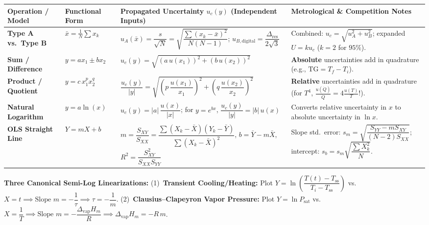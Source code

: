 \documentclass[10pt,twoside,openany,letterpaper]{book}
\begin{document}
\begin{quicksheet}
\begin{formulacard}
\par\smallskip\noindent
\scriptsize\setlength{\tabcolsep}{3pt}\renewcommand{\arraystretch}{1.12}
\begin{tabularx}{\linewidth}{@{}l l l X@{}}
\toprule
\textbf{Operation / Model} & \textbf{Functional Form} & \textbf{Propagated Uncertainty $u_c(y)$ (Independent Inputs)} & \textbf{Metrological \& Competition Notes} \\
\midrule
\textbf{Type A vs.\ Type B} & $\bar{x} = \frac{1}{N}\sum x_k$ & $u_A(\bar{x}) = \dfrac{s}{\sqrt{N}} = \sqrt{\dfrac{\sum(x_k-\bar{x})^2}{N(N-1)}}$; \quad $u_{B,\mathrm{digital}} = \dfrac{\Delta_{\mathrm{res}}}{2\sqrt{3}}$ & Combined: $u_c = \sqrt{u_A^2 + u_B^2}$; expanded $U = k u_c$ ($k=2$ for $95\%$). \\
\textbf{Sum / Difference} & $y = a x_1 \pm b x_2$ & $u_c(y) = \sqrt{(a\,u(x_1))^2 + (b\,u(x_2))^2}$ & \textbf{Absolute} uncertainties add in quadrature (e.g., $\mathrm{TG} = T_f - T_i$). \\
\textbf{Product / Quotient} & $y = c\,x_1^p x_2^q$ & $\dfrac{u_c(y)}{|y|} = \sqrt{\left(p\,\dfrac{u(x_1)}{x_1}\right)^2 + \left(q\,\dfrac{u(x_2)}{x_2}\right)^2}$ & \textbf{Relative} uncertainties add in quadrature (for $T^4$, $\frac{u(\dot{Q})}{\dot{Q}} = 4\frac{u(T)}{T}$!). \\
\textbf{Natural Logarithm} & $y = a\ln(x)$ & $u_c(y) = |a|\,\dfrac{u(x)}{|x|}$; \quad for $y = e^{bx}$, $\dfrac{u_c(y)}{|y|} = |b|\,u(x)$ & Converts relative uncertainty in $x$ to absolute uncertainty in $\ln x$. \\
\textbf{OLS Straight Line} & $Y = m X + b$ & $m = \dfrac{S_{XY}}{S_{XX}} = \dfrac{\sum(X_k-\bar{X})(Y_k-\bar{Y})}{\sum(X_k-\bar{X})^2}$, \quad $b = \bar{Y} - m\bar{X}$, \quad $R^2 = \dfrac{S_{XY}^2}{S_{XX}S_{YY}}$ & Slope std.\ error: $s_m = \sqrt{\dfrac{S_{YY} - m S_{XY}}{(N-2)S_{XX}}}$; intercept: $s_b = s_m\sqrt{\dfrac{\sum X_k^2}{N}}$. \\
\bottomrule
\end{tabularx}
\par\smallskip\noindent
\textbf{Three Canonical Semi-Log Linearizations:}
(1)~\textbf{Transient Cooling/Heating:} Plot $Y = \ln\left(\dfrac{T(t) - T_{\mathrm{ss}}}{T_i - T_{\mathrm{ss}}}\right)$ vs.\ $X = t \implies \text{Slope } m = -\dfrac{1}{\tau} \implies \tau = -\dfrac{1}{m}$.
(2)~\textbf{Clausius--Clapeyron Vapor Pressure:} Plot $Y = \ln P_{\mathrm{sat}}$ vs.\ $X = \dfrac{1}{T} \implies \text{Slope } m = -\dfrac{\Delta_{\mathrm{vap}}H_m}{R} \implies \Delta_{\mathrm{vap}}H_m = -R\,m$.

\end{formulacard}
\end{quicksheet}
\end{document}
